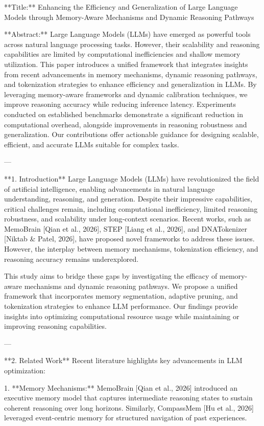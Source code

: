 **Title:**  
Enhancing the Efficiency and Generalization of Large Language Models through Memory-Aware Mechanisms and Dynamic Reasoning Pathways  

**Abstract:**  
Large Language Models (LLMs) have emerged as powerful tools across natural language processing tasks. However, their scalability and reasoning capabilities are limited by computational inefficiencies and shallow memory utilization. This paper introduces a unified framework that integrates insights from recent advancements in memory mechanisms, dynamic reasoning pathways, and tokenization strategies to enhance efficiency and generalization in LLMs. By leveraging memory-aware frameworks and dynamic calibration techniques, we improve reasoning accuracy while reducing inference latency. Experiments conducted on established benchmarks demonstrate a significant reduction in computational overhead, alongside improvements in reasoning robustness and generalization. Our contributions offer actionable guidance for designing scalable, efficient, and accurate LLMs suitable for complex tasks.

---

**1. Introduction**  
Large Language Models (LLMs) have revolutionized the field of artificial intelligence, enabling advancements in natural language understanding, reasoning, and generation. Despite their impressive capabilities, critical challenges remain, including computational inefficiency, limited reasoning robustness, and scalability under long-context scenarios. Recent works, such as MemoBrain [Qian et al., 2026], STEP [Liang et al., 2026], and DNATokenizer [Niktab & Patel, 2026], have proposed novel frameworks to address these issues. However, the interplay between memory mechanisms, tokenization efficiency, and reasoning accuracy remains underexplored.  

This study aims to bridge these gaps by investigating the efficacy of memory-aware mechanisms and dynamic reasoning pathways. We propose a unified framework that incorporates memory segmentation, adaptive pruning, and tokenization strategies to enhance LLM performance. Our findings provide insights into optimizing computational resource usage while maintaining or improving reasoning capabilities.

---

**2. Related Work**  
Recent literature highlights key advancements in LLM optimization:  

1. **Memory Mechanisms:** MemoBrain [Qian et al., 2026] introduced an executive memory model that captures intermediate reasoning states to sustain coherent reasoning over long horizons. Similarly, CompassMem [Hu et al., 2026] leveraged event-centric memory for structured navigation of past experiences.  

